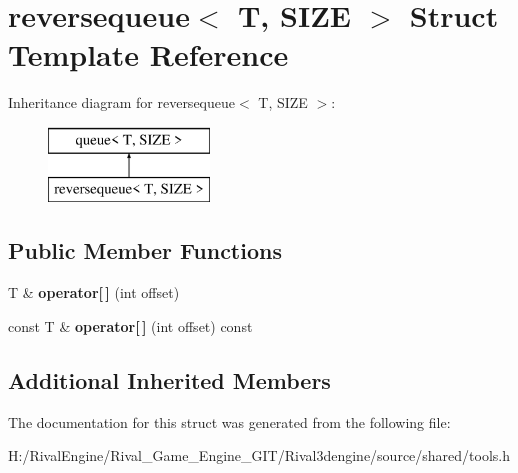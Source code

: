 \hypertarget{structreversequeue}{}\section{reversequeue$<$ T, S\+I\+ZE $>$ Struct Template Reference}
\label{structreversequeue}
Inheritance diagram for reversequeue$<$ T, S\+I\+ZE $>$\+:\begin{figure}[H]
\begin{center}
\leavevmode
\includegraphics[height=2.000000cm]{structreversequeue}
\end{center}
\end{figure}
\subsection*{Public Member Functions}
\begin{DoxyCompactItemize}
\item 
\mbox{\label{structreversequeue_a17975a9326963561076ce419f206e63a}} 
T \& {\bfseries operator\mbox{[}$\,$\mbox{]}} (int offset)
\item 
\mbox{\label{structreversequeue_a0ab151629a9267a4891aa8936fcd836d}} 
const T \& {\bfseries operator\mbox{[}$\,$\mbox{]}} (int offset) const
\end{DoxyCompactItemize}
\subsection*{Additional Inherited Members}


The documentation for this struct was generated from the following file\+:\begin{DoxyCompactItemize}
\item 
H\+:/\+Rival\+Engine/\+Rival\+\_\+\+Game\+\_\+\+Engine\+\_\+\+G\+I\+T/\+Rival3dengine/source/shared/tools.\+h\end{DoxyCompactItemize}
